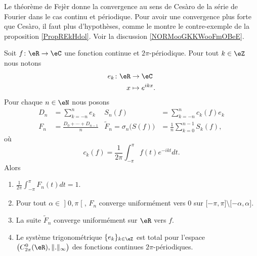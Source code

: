 Le théorème de Fejèr donne la convergence au sens de Cesàro de la série de Fourier dans le cas continu et périodique. Pour avoir une convergence plus forte que Cesàro, il faut plus d'hypothèses, comme le montre le contre-exemple de la proposition \ref{PropREkHdol}. Voir la discussion \ref{NORMooGKKWooFmOBeE}.
\begin{theorem}[Fejèr]      \label{ThoJFqczow}
	Soit \( f\colon \eR\to \eC\) une fonction continue et \( 2\pi\)-périodique. Pour tout \( k\in \eZ\) nous notons
	\begin{equation}
		\begin{aligned}
			e_k\colon \eR & \to \eC          \\
			x             & \mapsto e^{ikx}.
		\end{aligned}
	\end{equation}
	Pour chaque \( n\in \eN\) nous posons
	\begin{subequations}
		\begin{align}
			D_n & =\sum_{k=-n}^ne_k                   & S_n(f)                              & =\sum_{k=-n}^nc_k(f)e_k               \\
			F_n & =\frac{ D_0+\cdots + D_{n-1} }{ n } & \tilde F_n=\sigma_n\big( S(f) \big) & =\frac{1}{ n }\sum_{k=0}^{n-1}S_k(f),
		\end{align}
	\end{subequations}
	où
	\begin{equation}
		c_k(f)=\frac{1}{ 2\pi }\int_{-\pi}^{\pi}f(t) e^{-ikt}dt.
	\end{equation}
	Alors
	\begin{enumerate}
		\item
		      \( \frac{1}{ 2\pi }\int_{-\pi}^{\pi}F_n(t)dt=1\).
		\item
		      Pour tout \( \alpha\in \mathopen] 0 , \pi \mathclose[\), \( F_n\) converge uniformément vers \( 0\) sur \( \mathopen[ -\pi , \pi \mathclose]\setminus\mathopen[ -\alpha , \alpha \mathclose]\).
		\item
		      La suite \( \tilde F_n \) converge uniformément sur \( \eR\) vers \( f\).
		\item   \label{ItemUNQSPmyiv}
		      Le système trigonométrique \( \{ e_k \}_{k\in\eZ}\) est total pour l'espace \( \big( C^0_{2\pi}(\eR),\| . \|_{\infty} \big)\) des fonctions continues \( 2\pi\)-périodiques.
	\end{enumerate}
\end{theorem}


